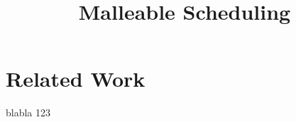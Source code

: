 \documentclass{article}
\author{}
\date{}
\title{Malleable Scheduling}
\begin{document}
    \maketitle
    \section{Related Work}

    blabla
123
	
\end{document}
